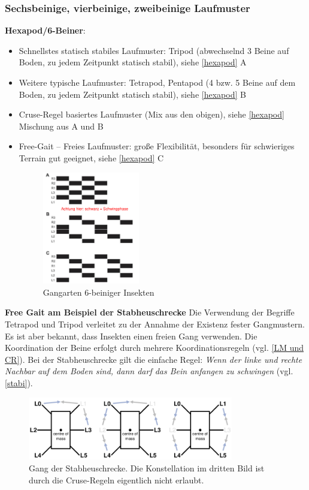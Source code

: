 \subsubsection{Sechsbeinige, vierbeinige, zweibeinige Laufmuster}
\textbf{Hexapod/6-Beiner}:
\begin{itemize}
\item Schnellstes statisch stabiles Laufmuster: Tripod (abwechselnd 3 Beine auf Boden, zu jedem Zeitpunkt statisch stabil), siehe \autoref{hexapod} A
\item Weitere typische Laufmuster: Tetrapod, Pentapod (4 bzw. 5 Beine auf dem Boden, zu jedem Zeitpunkt statisch stabil), siehe \autoref{hexapod} B
\item Cruse-Regel basiertes Laufmuster (Mix aus den obigen), siehe \autoref{hexapod} Mischung aus A und B
\item Free-Gait -- \glqq Freies Laufmuster\grqq{}: große Flexibilität, besonders für schwieriges Terrain gut geeignet, siehe \autoref{hexapod} C
\begin{figure}[h!]
	\centering
	\includegraphics[width=0.4\textwidth]{figures/ch06_hexapod.png}
	\caption{Gangarten 6-beiniger Insekten}
	\label{hexapod}
\end{figure}
\end{itemize}
\textbf{Free Gait am Beispiel der Stabheuschrecke}
Die Verwendung der Begriffe Tetrapod und Tripod verleitet zu der Annahme der Existenz fester Gangmustern.
Es ist aber bekannt, dass Insekten einen freien Gang verwenden. Die Koordination der Beine erfolgt durch mehrere Koordinationsregeln (vgl. \autoref{LM und CR}). Bei der Stabheuschrecke 
gilt die einfache Regel: \textit{Wenn der linke und rechte Nachbar auf dem Boden sind, dann darf das Bein anfangen zu schwingen} (vgl. \autoref{stabi}). 
\begin{figure}[h!]
	\centering
	\includegraphics[width=0.8\textwidth]{figures/ch06_stabi.png}
	\caption{Gang der Stabheuschrecke. Die Konstellation im dritten Bild ist durch die Cruse-Regeln eigentlich nicht erlaubt.}
	\label{stabi}
\end{figure}
